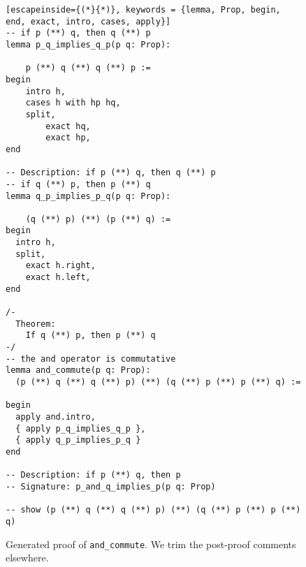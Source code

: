\begin{figure*}[h]
\label{leancommute}
\begin{lstlisting}[escapeinside={(*}{*)}, keywords = {lemma, Prop, begin, end, exact, intro, cases, apply}]
-- if p (**) q, then q (**) p
lemma p_q_implies_q_p(p q: Prop):

    p (**) q (**) q (**) p :=
begin
    intro h,
    cases h with hp hq,
    split,
        exact hq,
        exact hp,
end

-- Description: if p (**) q, then q (**) p
-- if q (**) p, then p (**) q
lemma q_p_implies_p_q(p q: Prop):

    (q (**) p) (**) (p (**) q) :=
begin
  intro h,
  split,
    exact h.right,
    exact h.left,
end

/-
  Theorem:
    If q (**) p, then p (**) q
-/
-- the and operator is commutative
lemma and_commute(p q: Prop):
  (p (**) q (**) q (**) p) (**) (q (**) p (**) p (**) q) :=

begin
  apply and.intro,
  { apply p_q_implies_q_p },
  { apply q_p_implies_p_q }
end

-- Description: if p (**) q, then p
-- Signature: p_and_q_implies_p(p q: Prop)

-- show (p (**) q (**) q (**) p) (**) (q (**) p (**) p (**) q)
\end{lstlisting}
\caption{Generated proof of \lstinline{and_commute}. We trim the post-proof comments elsewhere.}
\end{figure*}


